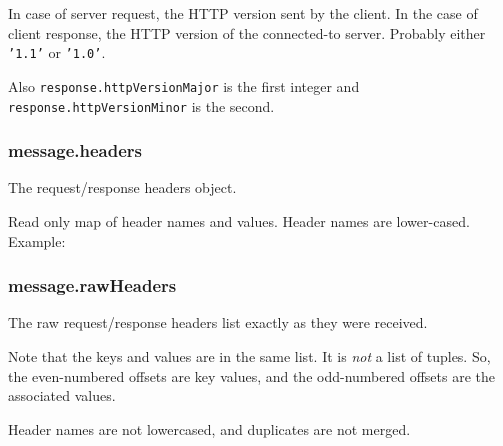 In case of server request, the HTTP version sent by the client. In the
case of client response, the HTTP version of the connected-to server.
Probably either \texttt{'1.1'} or \texttt{'1.0'}.

Also \texttt{response.httpVersionMajor} is the first integer and
\texttt{response.httpVersionMinor} is the second.

\subsubsection{message.headers}\label{message.headers}

The request/response headers object.

Read only map of header names and values. Header names are lower-cased.
Example:

\begin{Shaded}
\begin{Highlighting}[]
\CommentTok{//}
\NormalTok{(}\NormalTok{);}
\end{Highlighting}
\end{Shaded}

\subsubsection{message.rawHeaders}\label{message.rawheaders}

The raw request/response headers list exactly as they were received.

Note that the keys and values are in the same list. It is \emph{not} a
list of tuples. So, the even-numbered offsets are key values, and the
odd-numbered offsets are the associated values.

Header names are not lowercased, and duplicates are not merged.

\begin{Shaded}
\begin{Highlighting}[]
\CommentTok{//}
\CommentTok{// [ 'user-agent',}
\CommentTok{//   '*/*' ]}
\NormalTok{(}\NormalTok{);}
\end{Highlighting}
\end{Shaded}


